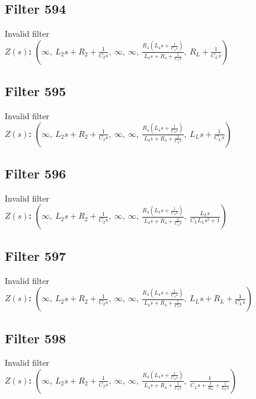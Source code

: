 \documentclass{article}
\begin{document}
\subsection*{Filter 594}
Invalid filter \\ 
\textbf{$Z(s)$:} $\left( \infty, \  L_{2} s + R_{2} + \frac{1}{C_{2} s}, \  \infty, \  \infty, \  \frac{R_{4} \left(L_{4} s + \frac{1}{C_{4} s}\right)}{L_{4} s + R_{4} + \frac{1}{C_{4} s}}, \  R_{L} + \frac{1}{C_{L} s}\right)$ \\ 
\subsection*{Filter 595}
Invalid filter \\ 
\textbf{$Z(s)$:} $\left( \infty, \  L_{2} s + R_{2} + \frac{1}{C_{2} s}, \  \infty, \  \infty, \  \frac{R_{4} \left(L_{4} s + \frac{1}{C_{4} s}\right)}{L_{4} s + R_{4} + \frac{1}{C_{4} s}}, \  L_{L} s + \frac{1}{C_{L} s}\right)$ \\ 
\subsection*{Filter 596}
Invalid filter \\ 
\textbf{$Z(s)$:} $\left( \infty, \  L_{2} s + R_{2} + \frac{1}{C_{2} s}, \  \infty, \  \infty, \  \frac{R_{4} \left(L_{4} s + \frac{1}{C_{4} s}\right)}{L_{4} s + R_{4} + \frac{1}{C_{4} s}}, \  \frac{L_{L} s}{C_{L} L_{L} s^{2} + 1}\right)$ \\ 
\subsection*{Filter 597}
Invalid filter \\ 
\textbf{$Z(s)$:} $\left( \infty, \  L_{2} s + R_{2} + \frac{1}{C_{2} s}, \  \infty, \  \infty, \  \frac{R_{4} \left(L_{4} s + \frac{1}{C_{4} s}\right)}{L_{4} s + R_{4} + \frac{1}{C_{4} s}}, \  L_{L} s + R_{L} + \frac{1}{C_{L} s}\right)$ \\ 
\subsection*{Filter 598}
Invalid filter \\ 
\textbf{$Z(s)$:} $\left( \infty, \  L_{2} s + R_{2} + \frac{1}{C_{2} s}, \  \infty, \  \infty, \  \frac{R_{4} \left(L_{4} s + \frac{1}{C_{4} s}\right)}{L_{4} s + R_{4} + \frac{1}{C_{4} s}}, \  \frac{1}{C_{L} s + \frac{1}{R_{L}} + \frac{1}{L_{L} s}}\right)$ \\ 
\end{document}
